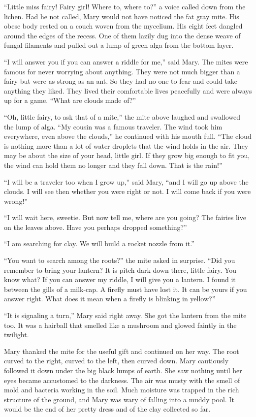 \documentclass[10pt]{memoir}
\begin{document}
``Little miss fairy! Fairy girl! Where to, where to?'' a voice called down from
the lichen. Had he not called, Mary would not have noticed the fat gray mite.
His obese body rested on a couch woven from the mycelium. His eight feet
dangled around the edges of the recess. One of them lazily dug into the dense
weave of fungal filaments and pulled out a lump of green alga from the bottom
layer.

``I will answer you if you can answer a riddle for me,'' said Mary. The mites
were famous for never worrying about anything. They were not much bigger than a
fairy but were as strong as an ant. So they had no one to fear and could take
anything they liked. They lived their comfortable lives peacefully and were
always up for a game. ``What are clouds made of?''

``Oh, little fairy, to ask that of a mite,'' the mite above laughed and
swallowed the lump of alga. ``My cousin was a famous traveler. The wind took
him everywhere, even above the clouds,'' he continued with his mouth full.
``The cloud is nothing more than a lot of water droplets that the wind holds in
the air. They may be about the size of your head, little girl. If they grow big
enough to fit you, the wind can hold them no longer and they fall down. That is
the rain!''

``I will be a traveler too when I grow up,'' said Mary, ``and I will go up
above the clouds. I will see then whether you were right or not. I will come
back if you were wrong!''

``I will wait here, sweetie. But now tell me, where are you going? The fairies
live on the leaves above. Have you perhaps dropped something?''

``I am searching for clay. We will build a rocket nozzle from it.''

``You want to search among the roots?'' the mite asked in surprise. ``Did you
remember to bring your lantern? It is pitch dark down there, little fairy. You
know what? If you can answer my riddle, I will give you a lantern. I found it
between the gills of a milk-cap. A firefly must have lost it. It can be yours
if you answer right. What does it mean when a firefly is blinking in yellow?''

``It is signaling a turn,'' Mary said right away. She got the lantern from the
mite too. It was a hairball that smelled like a mushroom and glowed faintly in
the twilight.

Mary thanked the mite for the useful gift and continued on her way. The root
curved to the right, curved to the left, then curved down. Mary cautiously
followed it down under the big black lumps of earth. She saw nothing until her
eyes became accustomed to the darkness. The air was musty with the smell of
mold and bacteria working in the soil. Much moisture was trapped in the rich
structure of the ground, and Mary was wary of falling into a muddy pool. It
would be the end of her pretty dress and of the clay collected so far.
\end{document}
